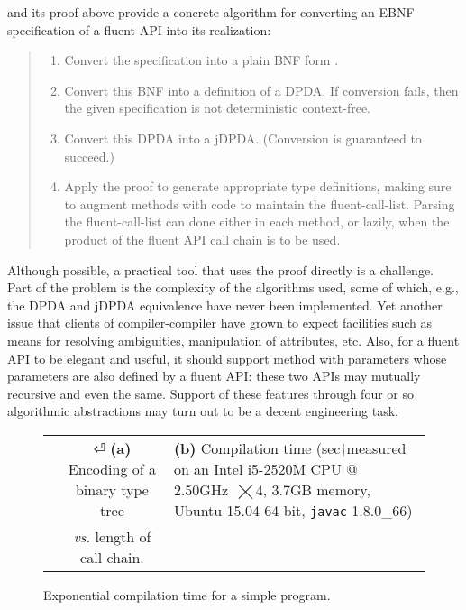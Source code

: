  and its proof above provide
  a concrete algorithm for converting an EBNF specification of a fluent API into
its realization:
\begin{quote}
  \begin{enumerate}
    \item Convert the specification into a plain BNF form
    .
    \item Convert this BNF into a definition of a DPDA\@. If conversion fails,
      then the given specification is not deterministic context-free.
    \item Convert this DPDA into a jDPDA. (Conversion is guaranteed to succeed.)
    \item Apply the proof to generate appropriate \Java type definitions, making sure to
        augment methods with code to maintain the fluent-call-list.
        Parsing the fluent-call-list can done either in each method,
        or lazily, when the product of the fluent API call chain is to
         be used.
  \end{enumerate}
\end{quote}
Although possible, a practical tool that uses the proof directly 
  is a challenge. 
Part of the problem is the complexity of the 
  algorithms used, some of which, e.g., the DPDA and jDPDA equivalence have never been 
  implemented.
Yet another issue that clients of compiler-compiler have grown to expect 
  facilities such as means for resolving ambiguities, manipulation 
  of attributes, etc.
Also, for a fluent API to be elegant and useful, 
  it should support method with parameters whose parameters are also defined by a  fluent API:
these two APIs may mutually recursive and even the same. 
Support of these features through four or so algorithmic abstractions 
  may turn out to be a decent engineering task.

\begin{figure}[H]
  \caption{\label{Figure:compiler} Exponential compilation time for a simple \Java program.
  }
  \begin{minipage}{\textwidth}
  \begin{tabular}{@{}c@{}c@{}}
    \hspace{3ex}\parbox[c]{44ex}{} &
    \hspace{0ex} \parbox[c]{44ex}{}⏎
      \textbf{(a)} Encoding of a binary type tree 
    & 
      \textbf{(b)} Compilation time 
      (sec†{\scriptsize{measured on an Intel i5-2520M CPU @ 2.50GHz~$⨉$4, 3.7GB memory, Ubuntu 15.04 64-bit, \texttt{javac} 1.8.0\_66}})%
    \\ &
     \emph{vs.}
      length of call chain.
  \end{tabular}
  \end{minipage}
\end{figure}


